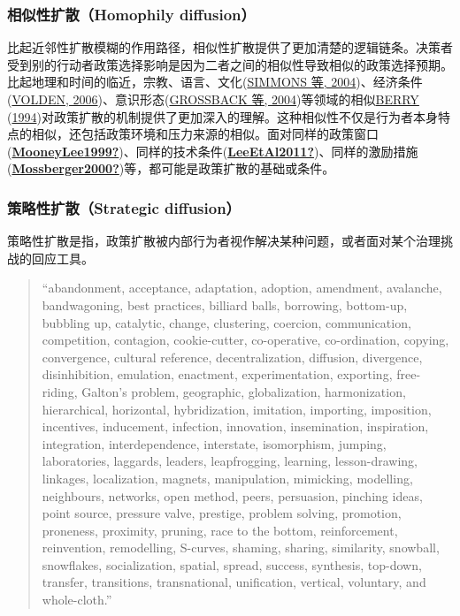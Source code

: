 \documentclass[
  12pt,
]{ctexart}
\begin{document}
\hypertarget{ux76f8ux4f3cux6027ux6269ux6563homophily-diffusion}{%
\subsubsection{相似性扩散（Homophily diffusion）}\label{ux76f8ux4f3cux6027ux6269ux6563homophily-diffusion}}

比起近邻性扩散模糊的作用路径，相似性扩散提供了更加清楚的逻辑链条。决策者受到别的行动者政策选择影响是因为二者之间的相似性导致相似的政策选择预期。比起地理和时间的临近，宗教、语言、文化(\protect\hyperlink{ref-SimmonsElkins2004}{SIMMONS 等, 2004})、经济条件(\protect\hyperlink{ref-Volden2006}{VOLDEN, 2006})、意识形态(\protect\hyperlink{ref-GrossbackEtAl2004a}{GROSSBACK 等, 2004})等领域的相似\protect\hyperlink{ref-Berry1994}{BERRY} (\protect\hyperlink{ref-Berry1994}{1994})对政策扩散的机制提供了更加深入的理解。这种相似性不仅是行为者本身特点的相似，还包括政策环境和压力来源的相似。面对同样的政策窗口(\protect\hyperlink{ref-MooneyLee1999}{\textbf{MooneyLee1999?}})、同样的技术条件(\protect\hyperlink{ref-LeeEtAl2011}{\textbf{LeeEtAl2011?}})、同样的激励措施(\protect\hyperlink{ref-Mossberger2000}{\textbf{Mossberger2000?}})等，都可能是政策扩散的基础或条件。

\hypertarget{ux7b56ux7565ux6027ux6269ux6563strategic-diffusion}{%
\subsubsection{策略性扩散（Strategic diffusion）}\label{ux7b56ux7565ux6027ux6269ux6563strategic-diffusion}}

策略性扩散是指，政策扩散被内部行为者视作解决某种问题，或者面对某个治理挑战的回应工具。

\begin{quote}
``abandonment, acceptance, adaptation, adoption, amendment, avalanche, bandwagoning, best practices, billiard balls, borrowing, bottom-up, bubbling up, catalytic, change, clustering, coercion, communication, competition, contagion, cookie-cutter, co-operative, co-ordination, copying, convergence, cultural reference, decentralization, diffusion, divergence, disinhibition, emulation, enactment, experimentation, exporting, free-riding, Galton's problem, geographic, globalization, harmonization, hierarchical, horizontal, hybridization, imitation, importing, imposition, incentives, inducement, infection, innovation, insemination, inspiration, integration, interdependence, interstate, isomorphism, jumping, laboratories, laggards, leaders, leapfrogging, learning, lesson-drawing, linkages, localization, magnets, manipulation, mimicking, modelling, neighbours, networks, open method, peers, persuasion, pinching ideas, point source, pressure valve, prestige, problem solving, promotion, proneness, proximity, pruning, race to the bottom, reinforcement, reinvention, remodelling, S-curves, shaming, sharing, similarity, snowball, snowflakes, socialization, spatial, spread, success, synthesis, top-down, transfer, transitions, transnational, unification, vertical, voluntary, and whole-cloth.''
\end{quote}
\end{document}
